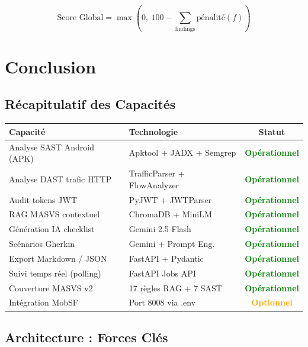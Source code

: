 \documentclass[12pt,a4paper,french]{article}
\newcommand{\ok}[1]{\textcolor{green}{\textbf{#1}}}
\begin{document}
$$\text{Score Global} = \max\!\left(0,\ 100 - \sum_{\text{findings}} \text{pénalité}(f)\right)$$

\section{Conclusion}

\subsection{Récapitulatif des Capacités}

\begin{center}
\renewcommand{\arraystretch}{1.4}
\begin{tabular}{llc}
\toprule
\textbf{Capacité} & \textbf{Technologie} & \textbf{Statut} \\
\midrule
\rowcolor{green!6}
Analyse SAST Android (APK) & Apktool + JADX + Semgrep & \ok{Opérationnel} \\
Analyse DAST trafic HTTP & TrafficParser + FlowAnalyzer & \ok{Opérationnel} \\
\rowcolor{green!6}
Audit tokens JWT & PyJWT + JWTParser & \ok{Opérationnel} \\
RAG MASVS contextuel & ChromaDB + MiniLM & \ok{Opérationnel} \\
\rowcolor{green!6}
Génération IA checklist & Gemini 2.5 Flash & \ok{Opérationnel} \\
Scénarios Gherkin & Gemini + Prompt Eng. & \ok{Opérationnel} \\
\rowcolor{green!6}
Export Markdown / JSON & FastAPI + Pydantic & \ok{Opérationnel} \\
Suivi temps réel (polling) & FastAPI Jobs API & \ok{Opérationnel} \\
\rowcolor{green!6}
Couverture MASVS v2 & 17 règles RAG + 7 SAST & \ok{Opérationnel} \\
Intégration MobSF & Port 8008 via .env & \textcolor{orange}{\textbf{Optionnel}} \\
\bottomrule
\end{tabular}
\end{center}

\subsection{Architecture : Forces Clés}
\end{document}
